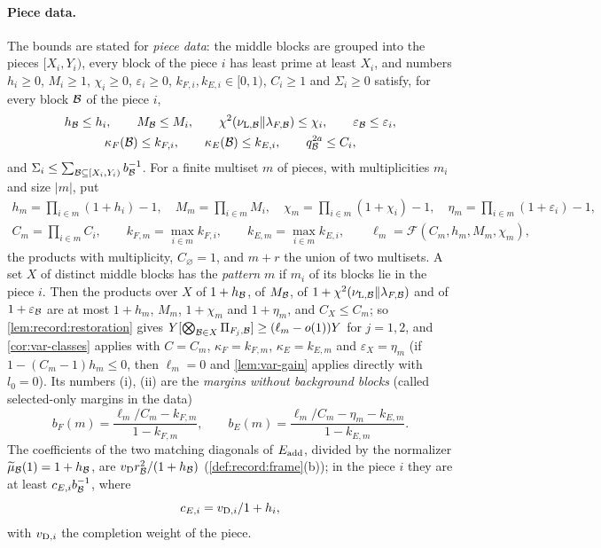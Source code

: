 \paragraph{Piece data.}
The bounds are stated for \emph{piece data}: the middle blocks are grouped into
the pieces $[X_i,Y_i)$, every block of the piece $i$ has least prime at least
$X_i$, and numbers $h_i\ge0$, $M_i\ge1$, $\chi_i\ge0$, $\varepsilon_i\ge0$,
$k_{F,i},k_{E,i}\in[0,1)$, $C_i\ge1$ and $\Sigma_i\ge0$ satisfy, for every block
$\Blk$ of the piece $i$,
\begin{gather*}
 h_\Blk\le h_i,\qquad M_\Blk\le M_i,\qquad
 \chi^2(\nu_{\mathrm L,\Blk}\|\lambda_{F,\Blk})\le\chi_i,\qquad
 \varepsilon_\Blk\le\varepsilon_i,\\
 \kappa_F(\Blk)\le k_{F,i},\qquad\kappa_E(\Blk)\le k_{E,i},\qquad
 q_\Blk^{2a}\le C_i,
\end{gather*}
and $\Sigma_i\le\sum_{\Blk\subseteq[X_i,Y_i)}b_\Blk^{-1}$. For a finite multiset $m$
of pieces, with multiplicities $m_i$ and size $|m|$, put
\begin{gather*}
 h_m=\prod_{i\in m}(1+h_i)-1,\quad M_m=\prod_{i\in m}M_i,\quad
 \chi_m=\prod_{i\in m}(1+\chi_i)-1,\quad\eta_m=\prod_{i\in m}(1+\varepsilon_i)-1,\\
 C_m=\prod_{i\in m}C_i,\qquad k_{F,m}=\max_{i\in m}k_{F,i},\qquad
 k_{E,m}=\max_{i\in m}k_{E,i},\qquad\ell_m=\mathcal F(C_m,h_m,M_m,\chi_m),
\end{gather*}
the products with multiplicity, $C_\varnothing=1$, and $m+r$ the union of two
multisets. A set $X$ of distinct middle blocks has the \emph{pattern} $m$ if
$m_i$ of its blocks lie in the piece $i$. Then the products over $X$ of
$1+h_\Blk$, of $M_\Blk$, of $1+\chi^2(\nu_{\mathrm L,\Blk}\|\lambda_{F,\Blk})$ and of
$1+\varepsilon_\Blk$ are at most $1+h_m$, $M_m$, $1+\chi_m$ and $1+\eta_m$, and
$C_X\le C_m$; so \cref{lem:record:restoration} gives
$Y[\bigotimes_{\Blk\in X}\Pi_{F_j,\Blk}]\ge(\ell_m-o(1))Y$ for $j=1,2$, and
\cref{cor:var-classes} applies with $C=C_m$, $\kappa_F=k_{F,m}$,
$\kappa_E=k_{E,m}$ and $\varepsilon_X=\eta_m$ (if $1-(C_m-1)h_m\le0$, then
$\ell_m=0$ and \cref{lem:var-gain} applies directly with $l_0=0$). Its numbers
(i), (ii) are the \emph{margins without background blocks}
(called selected-only margins in the data)
\begin{equation}\label{eq:variance:margins}
 b_F(m)=\frac{\ell_m/C_m-k_{F,m}}{1-k_{F,m}},\qquad
 b_E(m)=\frac{\ell_m/C_m-\eta_m-k_{E,m}}{1-k_{E,m}} .
\end{equation}
The coefficients of the two matching diagonals of $E_{\rm add}$, divided by the
normalizer $\widetilde\mu_\Blk(1)=1+h_\Blk$, are $v_{{\rm D}}r_\Blk^2/(1+h_\Blk)$
(\cref{def:record:frame}(b)); in the piece $i$ they are at least
$c_{E,i}b_\Blk^{-1}$, where
\[
 c_{E,i}=\frac{v_{{\rm D},i}}{1+h_i},
\]
with $v_{{\rm D},i}$ the completion weight of the piece.

